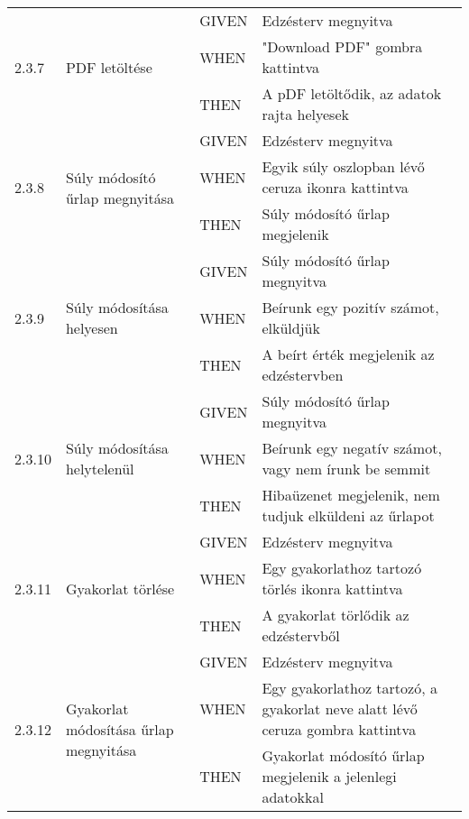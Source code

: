 \begin{center}
\begin{longtable}{ | p{} | p{} | p{} | p{} | }
			\multirow{3}{*}{2.3.7} 
			& \multirow{3}{=}{PDF letöltése} 
			& GIVEN 
			& Edzésterv megnyitva \\
			\cline{3-4}
			& & WHEN 
			& "Download PDF" gombra kattintva \\
			\cline{3-4}
			& & THEN 
			& A pDF letöltődik, az adatok rajta helyesek \\
			\hline

			\multirow{3}{*}{2.3.8} 
			& \multirow{3}{=}{Súly módosító űrlap megnyitása} 
			& GIVEN 
			& Edzésterv megnyitva \\
			\cline{3-4}
			& & WHEN 
			& Egyik súly oszlopban lévő ceruza ikonra kattintva \\
			\cline{3-4}
			& & THEN 
			& Súly módosító űrlap megjelenik \\
			\hline

			\multirow{3}{*}{2.3.9} 
			& \multirow{3}{=}{Súly módosítása helyesen} 
			& GIVEN 
			& Súly módosító űrlap megnyitva \\
			\cline{3-4}
			& & WHEN 
			& Beírunk egy pozitív számot, elküldjük \\
			\cline{3-4}
			& & THEN 
			& A beírt érték megjelenik az edzéstervben \\
			\hline

			\multirow{3}{*}{2.3.10} 
			& \multirow{3}{=}{Súly módosítása helytelenül} 
			& GIVEN 
			& Súly módosító űrlap megnyitva \\
			\cline{3-4}
			& & WHEN 
			& Beírunk egy negatív számot, vagy nem írunk be semmit \\
			\cline{3-4}
			& & THEN 
			& Hibaüzenet megjelenik, nem tudjuk elküldeni az űrlapot \\
			\hline

			\multirow{3}{*}{2.3.11} 
			& \multirow{3}{=}{Gyakorlat törlése} 
			& GIVEN 
			& Edzésterv megnyitva \\
			\cline{3-4}
			& & WHEN 
			& Egy gyakorlathoz tartozó törlés ikonra kattintva \\
			\cline{3-4}
			& & THEN 
			& A gyakorlat törlődik az edzéstervből \\
			\hline

			\multirow{3}{*}{2.3.12} 
			& \multirow{3}{=}{Gyakorlat módosítása űrlap megnyitása} 
			& GIVEN 
			& Edzésterv megnyitva \\
			\cline{3-4}
			& & WHEN 
			& Egy gyakorlathoz tartozó, a gyakorlat neve alatt lévő ceruza gombra kattintva \\
			\cline{3-4}
			& & THEN 
			& Gyakorlat módosító űrlap megjelenik a jelenlegi adatokkal \\
			\hline


\end{longtable}
\end{center}
